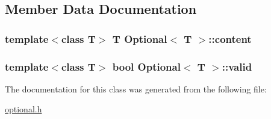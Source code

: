 \subsection{Member Data Documentation}
\subsubsection[{\texorpdfstring{content}{content}}]{\setlength{\rightskip}{0pt plus 5cm}template$<$class T$>$ T {\bf Optional}$<$ T $>$\+::content\hspace{0.3cm}{\ttfamily [private]}}\hypertarget{classOptional_a1c694f39ac1ed0deab4ab888b0529746}{}\label{classOptional_a1c694f39ac1ed0deab4ab888b0529746}
\subsubsection[{\texorpdfstring{valid}{valid}}]{\setlength{\rightskip}{0pt plus 5cm}template$<$class T$>$ bool {\bf Optional}$<$ T $>$\+::valid\hspace{0.3cm}{\ttfamily [private]}}\hypertarget{classOptional_a1c0ea9e0a240481b254de9f6cb401882}{}\label{classOptional_a1c0ea9e0a240481b254de9f6cb401882}


The documentation for this class was generated from the following file\+:\begin{DoxyCompactItemize}
\item 
\hyperlink{optional_8h}{optional.\+h}\end{DoxyCompactItemize}
